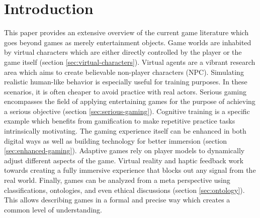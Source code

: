 \section{Introduction}
This paper provides an extensive overview of the current game literature which goes beyond games as merely entertainment objects.
Game worlds are inhabited by virtual characters which are either directly controlled by the player or the game itself (section \ref{sec:virtual-characters}).
Virtual agents are a vibrant research area which aims to create believable non-player characters (NPC).
Simulating realistic human-like behavior is especially useful for training purposes.
In these scenarios, it is often cheaper to avoid practice with real actors.
Serious gaming encompasses the field of applying entertaining games for the purpose of achieving a serious objective (section \ref{sec:serious-gaming}).
Cognitive training is a specific example which benefits from gamification to make repetitive practice tasks intrinsically motivating.
The gaming experience itself can be enhanced in both digital ways as well as building technology for better immersion (section \ref{sec:enhanced-gaming}).
Adaptive games rely on player models to dynamically adjust different aspects of the game.
Virtual reality and haptic feedback work towards creating a fully immersive experience that blocks out any signal from the real world.
Finally, games can be analyzed from a meta perspective using classifications, ontologies, and even ethical discussions (section \ref{sec:ontology}).
This allows describing games in a formal and precise way which creates a common level of understanding.